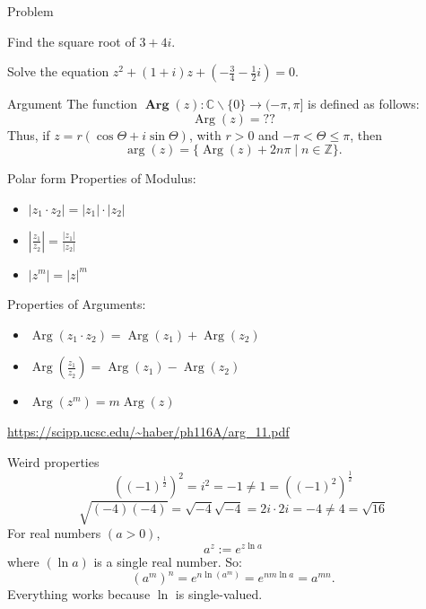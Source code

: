 \documentclass[11pt]{beamer}
\theoremstyle{plain}
\begin{document}
\begin{frame}{Problem}
    \begin{problem}
        Find the square root of $3+4i$. 
    \end{problem}
    \begin{problem}
        Solve the equation $z^2+(1+i)z+\left(-\frac34-\frac12i\right)=0$. 
    \end{problem}
\end{frame}
\begin{frame}{Argument}
    The function $\boldsymbol{\operatorname { A r g }}(z): \mathbb{C} \backslash\{0\} \rightarrow(-\pi, \pi]$ is defined as follows:
$$ 
\operatorname{Arg}(z)=??
$$
Thus, if $z=r(\cos \Theta+i \sin \Theta)$, with $r>0$ and $-\pi<\Theta \leq \pi$, then
$$
\arg (z)=\{\operatorname{Arg}(z)+2 n \pi \mid n \in \mathbb{Z}\} .
$$
\end{frame}
\begin{frame}{Polar form}
    Properties of Modulus:
    \begin{itemize}
        \item $|z_1\cdot z_2|=|z_1|\cdot|z_2|$
        \item $\left|\frac{z_1}{z_2}\right|=\frac{|z_1|}{|z_2|}$
        \item $|z^m|=|z|^m$
    \end{itemize}
    Properties of Arguments:
    \begin{itemize}
        \item $\operatorname{Arg} (z_1\cdot z_2)=\operatorname{Arg} (z_1)+\operatorname{Arg} (z_2)$
        \item $\operatorname{Arg}\left(\frac{z_1}{z_2}\right)=\operatorname{Arg}(z_1)-\operatorname{Arg}(z_2)$
        \item $\operatorname{Arg}(z^m)=m\operatorname{Arg}(z)$
    \end{itemize}
    \url{https://scipp.ucsc.edu/~haber/ph116A/arg_11.pdf}\\    
\end{frame}

\begin{frame}{Weird properties}
    $$\left((-1)^\frac{1}{2}\right)^2=i^2=-1\neq 1=\left((-1)^2\right)^\frac{1}{2}$$
    $$\sqrt{(-4)(-4)}=\sqrt{-4}\sqrt{-4}=2i\cdot2i=-4\neq4= \sqrt{16}$$
For real numbers $(a>0)$,
$$ 
a^z := e^{z\ln a}
$$
where $(\ln a)$ is a single real number.
So:
$$
(a^m)^n = e^{n\ln(a^m)} = e^{nm\ln a} = a^{mn}.
$$
Everything works because $\ln$ is single-valued.
\end{frame}
\end{document}
